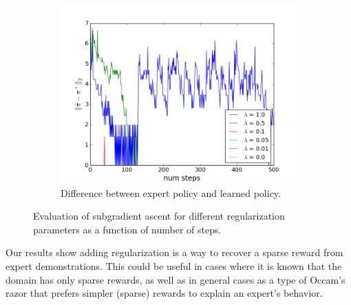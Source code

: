 \documentclass[10pt,a4paper]{article}
\begin{document}
\begin{figure}
    \begin{subfigure}[b]{0.65\textwidth}
        \includegraphics[width=\textwidth]{figs/policy_diff_reg_test.png}
        \caption{Difference between expert policy and learned policy.}
        \label{subfig:reg_policy_diff}
    \end{subfigure}
    \caption{Evaluation of subgradient ascent for different regularization parameters as a function of number of steps.}\label{fig:regularization_test}
\end{figure}

Our results show adding regularization is a way to recover a sparse reward from expert demonstrations. This could be useful in cases where it is known that the domain has only sparse rewards, as well as in general cases as a type of Occam's razor that prefers simpler (sparse) rewards to explain an expert's behavior.
 
\end{document}
